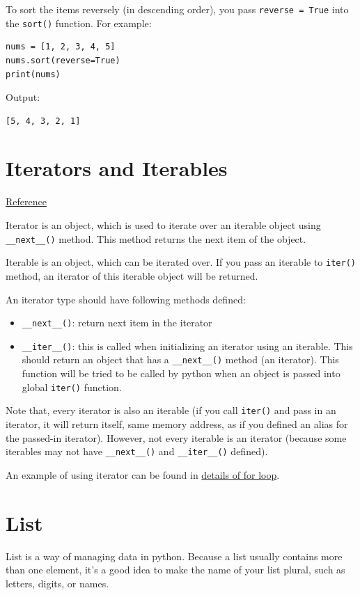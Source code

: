 \documentclass[12pt]{book}
\begin{document}
To sort the items reversely (in descending order), you pass \texttt{reverse = True} into the \texttt{sort()} function. For example:
\begin{verbatim}
nums = [1, 2, 3, 4, 5]
nums.sort(reverse=True)
print(nums)
\end{verbatim}
Output:
\begin{verbatim}
[5, 4, 3, 2, 1]
\end{verbatim}
\section{Iterators and Iterables \label{org49c6fd0}}
\label{sec:org7ac6502}
\href{https://www.geeksforgeeks.org/python-difference-iterable-iterator/}{Reference}

Iterator is an object, which is used to iterate over an iterable object using \texttt{\_\_next\_\_()} method. This method returns the next item of the object. 

Iterable is an object, which can be iterated over. If you pass an iterable to \texttt{iter()} method, an iterator of this iterable object will be returned.

An iterator type should have following methods defined:
\begin{itemize}
\item \texttt{\_\_next\_\_()}: return next item in the iterator
\item \texttt{\_\_iter\_\_()}: this is called when initializing an iterator using an iterable. This should return an object that has a \texttt{\_\_next\_\_()} method (an iterator). This function will be tried to be called by python when an object is passed into global \texttt{iter()} function.
\end{itemize}

Note that, every iterator is also an iterable (if you call \texttt{iter()} and pass in an iterator, it will return itself, same memory address, as if you defined an alias for the passed-in iterator). However, not every iterable is an iterator (because some iterables may not have \texttt{\_\_next\_\_()} and \texttt{\_\_iter\_\_()} defined).

An example of using iterator can be found in \hyperref[org900c2e7]{details of for loop}.
\section{List}
\label{sec:org78c3e5b}
List is a way of managing data in python. Because a list usually contains more than one element, it’s a good idea to make the name of your list plural, such as letters, digits, or names.
\end{document}
